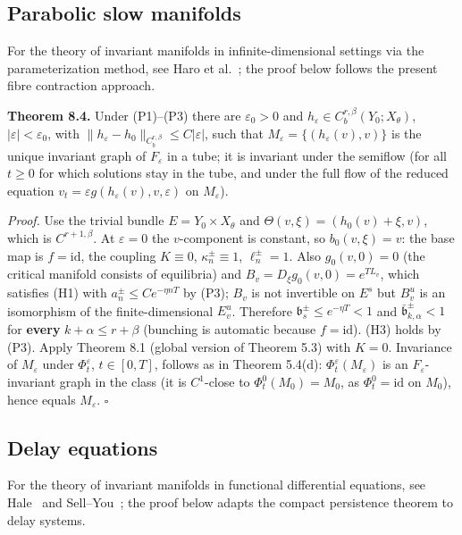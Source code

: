 \documentclass[11pt,a4paper]{article}
\theoremstyle{plain}
\theoremstyle{definition}
\theoremstyle{remark}
\numberwithin{equation}{section}
\numberwithin{figure}{section}
\begin{document}
\subsection{Parabolic slow manifolds}

For the theory of invariant manifolds in infinite-dimensional settings via the parameterization method, see Haro et al.~\cite{har16}; the proof below follows the present fibre contraction approach.

\textbf{Theorem 8.4.} Under (P1)–(P3) there are $\varepsilon_0>0$ and $h_\varepsilon\in C^{r,\beta}_b(Y_0;X_\theta)$, $|\varepsilon|<\varepsilon_0$, with $\|h_\varepsilon-h_0\|_{C^{r,\beta}_b}\le C|\varepsilon|$, such that $M_\varepsilon=\{(h_\varepsilon(v),v)\}$ is the unique invariant graph of $F_\varepsilon$ in a tube; it is invariant under the semiflow (for all $t\ge0$ for which solutions stay in the tube, and under the full flow of the reduced equation $v_t=\varepsilon g(h_\varepsilon(v),v,\varepsilon)$ on $M_\varepsilon$).

\textit{Proof.} Use the trivial bundle $E=Y_0\times X_\theta$ and $\Theta(v,\xi)=(h_0(v)+\xi,v)$, which is $C^{r+1,\beta}$. At $\varepsilon=0$ the $v$-component is constant, so $b_0(v,\xi)=v$: the base map is $f=\mathrm{id}$, the coupling $K\equiv0$, $\kappa^\pm_n\equiv1$, $\ell_n^\pm=1$. Also $g_0(v,0)=0$ (the critical manifold consists of equilibria) and $B_v=D_\xi g_0(v,0)=e^{TL_v}$, which satisfies (H1) with $a^\pm_n\le Ce^{-\eta nT}$ by (P3); $B_v$ is not invertible on $E^s$ but $B^u_v$ is an isomorphism of the finite-dimensional $E^u_v$. Therefore $\mathfrak b^\pm_s\le e^{-\eta T}<1$ and $\bar{\mathfrak b}^\pm_{k,\alpha}<1$ for \textbf{every} $k+\alpha\le r+\beta$ (bunching is automatic because $f=\mathrm{id}$). (H3) holds by (P3). Apply Theorem 8.1 (global version of Theorem 5.3) with $K=0$. Invariance of $M_\varepsilon$ under $\Phi^\varepsilon_t$, $t\in[0,T]$, follows as in Theorem 5.4(d): $\Phi^\varepsilon_t(M_\varepsilon)$ is an $F_\varepsilon$-invariant graph in the class (it is $C^1$-close to $\Phi_t^0(M_0)=M_0$, as $\Phi^0_t=\mathrm{id}$ on $M_0$), hence equals $M_\varepsilon$. $\square$

\subsection{Delay equations}

For the theory of invariant manifolds in functional differential equations, see Hale~\cite{hal77} and Sell–You~\cite{sell2002}; the proof below adapts the compact persistence theorem to delay systems.
\end{document}
